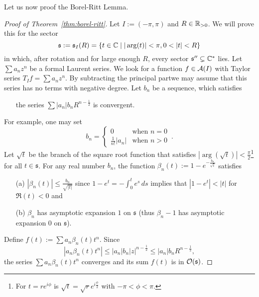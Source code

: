 Let us now proof the Borel-Ritt Lemma.
\begin{proof}[Proof of Theorem~\ref{thm:borel-ritt}]
  Let $I:=(-\pi,\pi)$ and $R\in\mathbb{R}_{>0}$.
  We will prove this for the sector
  \[
    \mathfrak{s}:=\mathfrak{s}_{I}(R)=\left\{
      t\in\C\mid |\arg(t)|<\pi, 0<|t|<R
    \right\}
  \]
  in which, after rotation and for large enough $R$, every sector
  $\mathfrak{s}''\subsetneq\mathbb{C}^*$ lies.
  Let $\sum a_nz^n$ be a formal Laurent series. We look for a function
  $f\in\mathcal{A}(I)$ with Taylor series $T_{I}f=\sum a_nz^n$.
  By subtracting the principal part\TODO[?] we may assume that this series has
  no terms with negative degree.
  Let $b_n$ be a sequence, which satisfies
  \begin{itemize}
    \item[] the series $\sum |a_n|b_nR^{n-\frac{1}{2}}$ is convergent.
  \end{itemize}
  For example\TODO[realy?], one may set
  \[
    b_n=\begin{cases}
      0                 & \text{when~} n=0
      \\\frac{1}{n!}|a_n| & \text{when~} n>0
    \end{cases}
    \,.
  \]
  Let $\sqrt{t}$ be the branch of the square root function that satisfies
  $|\arg(\sqrt{t})|<\frac{\pi}{2}$\footnote{For $t=re^{i\phi}$ is
  $\sqrt{t}=\sqrt{r}e^{i\frac{\phi}{2}}$ with $-\pi<\phi<\pi$.} for all
  $t\in\mathfrak{s}$.
  For any real number $b_n$, the function
  $\beta_n(t):=1-e^{-\frac{b_n}{\sqrt{t}}}$ satisfies
  \begin{enumerate}
    \item[(a)] $|\beta_n(t)|\leq\frac{b_n}{\sqrt{|t|}}$ since
      $1-e^t=-\int_0^te^s\,ds$ implies that $|1-e^t|<|t|$ for $\Re(t)<0$ and
    \item[(b)] $\beta_n$ has asymptotic expansion $1$ on $\mathfrak{s}$ (thus
      $\beta_n-1$ has asymptotic expansion $0$ on $\mathfrak{s}$).
  \end{enumerate}
  Define $f(t):=\sum a_n\beta_n(t)t^n$.
  Since
  \[
    |a_n\beta_n(t)t^n|
    \leq|a_n|b_n|z|^{n-\frac{1}{2}}
    \leq|a_n|b_nR^{n-\frac{1}{2}},
  \]
  the series
  $\sum a_n\beta_n(t)t^n$ converges and its sum $f(t)$ is in
  $\mathcal{O}(\mathfrak{s})$.


\end{proof}
